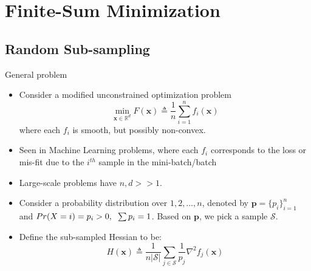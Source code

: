 \documentclass[10pt]{beamer}
\newcommand{\h}{\nabla^{2}}
\newcommand{\xbold}{\mathbf{x}}
\begin{document}
\section{Finite-Sum Minimization}
\subsection{Random Sub-sampling}
\begin{frame}{General problem}
\begin{itemize}
\item<1->{Consider a modified unconstrained optimization problem
  \begin{equation}
    \min_{\xbold \in \mathbb{R}^{d}} F(\xbold) \triangleq \frac{1}{n}\displaystyle \sum_{i=1}^{n} f_{i}(\xbold)
  \end{equation}
where each \(f_{i}\) is smooth, but possibly non-convex.}
\item<2->{Seen in Machine Learning problems, where each \(f_{i}\) corresponds to the loss or mis-fit due to the \(i^{th}\) sample in the mini-batch/batch}
\item<3->{Large-scale problems have \(n, d >> 1\).}
\item<4->{Consider a probability distribution over \({1, 2, \ldots, n}\), denoted by \(\mathbf{p} = \{p_{i}\}_{i=1}^{n}\) and \(Pr(X = i) = p_{i} > 0, \hspace{2mm} \sum p_{i} = 1\). Based on \(\mathbf{p}\), we pick a sample \(\mathcal{S}\).}
\item<5->{Define the sub-sampled Hessian to be:
  \begin{equation}
    H(\xbold) \triangleq \frac{1}{n|\mathcal{S}|}\sum_{j \in \mathcal{S}} \frac{1}{p_{j}} \h f_{j}(\xbold)
  \end{equation}
}
\end{itemize}
\end{frame}
\end{document}
